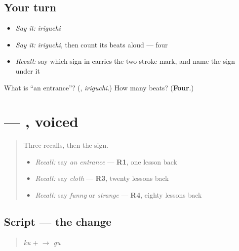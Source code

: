 \subsection*{Your turn}
\begin{itemize}
\raggedright
  \item \emph{Say it:} \emph{iriguchi}
  \item \emph{Say it:} \emph{iriguchi}, then count its beats aloud — four
  \item \emph{Recall:} say which sign in \textbf{} carries the two-stroke mark, and name the sign under it
\end{itemize}

\begin{tcolorbox}[breakable,colback=teal!4,colframe=teal!35!black,title={Before you move on}]
What is \textquotedblleft{}an entrance\textquotedblright{}? (\textbf{}, \emph{iriguchi}.) How many beats? (\textbf{Four}.)
\end{tcolorbox}
\section[\texorpdfstring{\ja{ぐ} (gu)}{ぐ (gu)}]{ — , voiced}

\label{lesson:JA-W135-gu}



\begin{quote}
Three recalls, then the sign.

\begin{itemize}
\raggedright
  \item \emph{Recall:} say \emph{an entrance} — \textbf{R1}, one lesson back
  \item \emph{Recall:} say \emph{cloth} — \textbf{R3}, twenty lessons back
  \item \emph{Recall:} say \emph{funny} or \emph{strange} — \textbf{R4}, eighty lessons back
\end{itemize}
\end{quote}

\subsection*{Script — the change}

\begin{quote}
\textbf{} \emph{ku} + \textbf{} $\to$ \textbf{} \emph{gu}
\end{quote}

